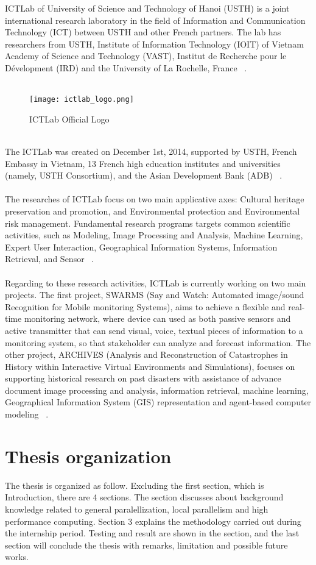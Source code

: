 ICTLab of University of Science and Technology of Hanoi (USTH) is a joint international research laboratory in the field of Information and Communication Technology (ICT) between USTH and other French partners. The lab has researchers from USTH, Institute of Information Technology (IOIT) of Vietnam Academy of Science and Technology (VAST), Institut de Recherche pour le Dévelopment (IRD) and the University of La Rochelle, France ~\cite{ictlab}. \\
~\\
\begin{figure}[h]
\texttt{[image: ictlab\_logo.png]}
\centering
\caption{ICTLab Official Logo}
\end{figure}
~\\
The ICTLab was created on December 1st, 2014, supported by USTH, French Embassy in Vietnam, 13 French high education institutes and universities (namely, USTH Consortium), and the Asian Development Bank (ADB) ~\cite{ictlab}. \\
~\\
The researches of ICTLab focus on two main applicative axes: Cultural heritage preservation and promotion, and Environmental protection and Environmental risk management. Fundamental research programs targets common scientific activities, such as Modeling, Image Processing and Analysis, Machine Learning, Expert User Interaction, Geographical Information Systems, Information Retrieval, and Sensor ~\cite{ictlab}. \\
~\\
Regarding to these research activities, ICTLab is currently working on two main projects. The first project, SWARMS (Say and Watch: Automated image/sound Recognition for Mobile monitoring Systems), aims to achieve a flexible and real-time monitoring network, where device can used as both passive sensors and active transmitter that can send visual, voice, textual pieces of information to a monitoring system, so that stakeholder can analyze and forecast information. The other project, ARCHIVES (Analysis and Reconstruction of Catastrophes in History within Interactive Virtual Environments and Simulations), focuses on supporting historical research on past disasters with assistance of advance document image processing and analysis, information retrieval, machine learning, Geographical Information System (GIS) representation and agent-based computer modeling ~\cite{ictlab}. \\

\section{Thesis organization}

The thesis is organized as follow. Excluding the first section, which is Introduction, there are 4 sections. The  section discusses about background knowledge related to general paralellization, local parallelism and high performance computing. Section 3 explains the methodology carried out during the internship period. Testing and result are shown in the  section, and the last section will conclude the thesis with remarks, limitation and possible future works. 
